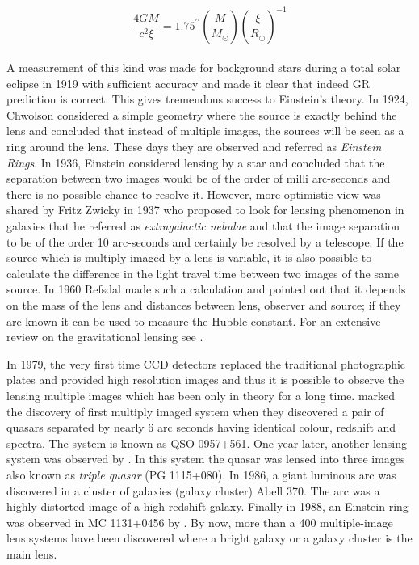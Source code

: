 \begin{equation}
	\dfrac{4GM}{c^2 \xi} = 1.75^{\prime \prime} 
					\left(\dfrac{M}{M_{\odot}}\right)
					\left(\dfrac{\xi}{R_{\odot}} \right)^{-1}
\end{equation}
\\
A measurement of this kind was made for background stars during a total solar eclipse
in 1919 with sufficient accuracy and made it clear that indeed GR prediction is 
correct. This gives tremendous success to Einstein's theory. In 1924, Chwolson
considered a simple geometry where the source is exactly behind the lens
and concluded that instead of multiple images, the sources will be seen
as a ring around the lens. These days they are observed and referred as {\it Einstein Rings}.
In 1936, Einstein
considered lensing by a star and concluded that the separation between two images
would be of the order of milli arc-seconds and there is no possible chance to
resolve it. However, more optimistic view was shared by Fritz Zwicky in 1937 who
proposed to look for lensing phenomenon in galaxies that he referred as 
{\it extragalactic nebulae} and that the image separation to be of the order 10 arc-seconds
and certainly be resolved by a telescope. If the source which is multiply imaged
by a lens is variable, it is also possible to calculate the difference 
in the light travel time between two images of the same source. In 1960 Refsdal
made such a calculation and pointed out that it depends on the mass of the lens
and distances between lens, observer and source; if they are known it can be 
used to measure the Hubble constant. For an extensive review on the gravitational
lensing see \citep{1992grle.book.....S,2001stgl.book.....P,2006glsw.conf.....M}.


In 1979, the very first time CCD detectors replaced the traditional photographic
plates and provided high resolution 
images and thus it is possible to observe the lensing multiple images
which has been only in theory for a long time. \cite{1979Natur.279..381W} marked
the discovery of first multiply imaged system when they discovered a pair of quasars
separated by nearly 6 arc seconds having identical colour, redshift and spectra. The
system is known as QSO 0957+561. One year later, another lensing system was observed
by \cite{1980Natur.285..641W}. In this system the quasar was lensed into three
images also known as {\it triple quasar} (PG 1115+080). In 1986, a giant luminous
arc was discovered in a cluster of galaxies (galaxy cluster) Abell 370. The arc
was a highly distorted image of a high redshift galaxy. Finally in 1988, an Einstein
ring was observed in MC 1131+0456 by \cite{1988Natur.333..537H}. By now, more than 
a 400 multiple-image lens systems have been discovered where a bright galaxy
or a galaxy cluster is the main lens. 





